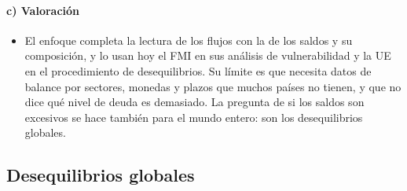 \documentclass[11pt]{article}
\begin{document}
\paragraph{c) Valoración}
\begin{itemize}
\item El enfoque completa la lectura de los flujos con la de los saldos y su composición, y lo usan hoy el FMI en sus análisis de vulnerabilidad y la UE en el procedimiento de desequilibrios. Su límite es que necesita datos de balance por sectores, monedas y plazos que muchos países no tienen, y que no dice qué nivel de deuda es demasiado. La pregunta de si los saldos son excesivos se hace también para el mundo entero: son los desequilibrios globales.
\end{itemize}

\subsection{Desequilibrios globales}\label{sec:desequilibrios-globales}
\end{document}
